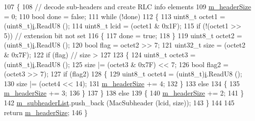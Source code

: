 \begin{DoxyCode}
107 \{
108         \textcolor{comment}{// decode sub-headers and create RLC info elements}
109         \hyperlink{classns3_1_1MmWaveMacPduHeader_ae473a43cc08ab2a1c7b9cb876c2642e8}{m\_headerSize} = 0;
110         \textcolor{keywordtype}{bool} done = \textcolor{keyword}{false};
111         \textcolor{keywordflow}{while} (!done)
112         \{
113                 uint8\_t octet1 = (uint8\_t)\hyperlink{bernuolliDistribution_8m_a6f6ccfcf58b31cb6412107d9d5281426}{i}.ReadU8 ();
114                 uint8\_t lcid = (octet1 & 0x1F);
115                 \textcolor{keywordflow}{if} (!(octet1 >> 5))  \textcolor{comment}{// extension bit not set}
116                 \{
117                         done = \textcolor{keyword}{true};
118                 \}
119                 uint8\_t octet2 = (uint8\_t)\hyperlink{bernuolliDistribution_8m_a6f6ccfcf58b31cb6412107d9d5281426}{i}.ReadU8 ();
120                 \textcolor{keywordtype}{bool} flag = octet2 >> 7;
121                 uint32\_t size = (octet2 & 0x7F);
122                 \textcolor{keywordflow}{if} (flag) \textcolor{comment}{// size > 127}
123                 \{
124                         uint8\_t octet3 = (uint8\_t)\hyperlink{bernuolliDistribution_8m_a6f6ccfcf58b31cb6412107d9d5281426}{i}.ReadU8 ();
125                         size |= (octet3 & 0x7F) << 7;
126                         \textcolor{keywordtype}{bool} flag2 = (octet3 >> 7);
127                         \textcolor{keywordflow}{if} (flag2)
128                         \{
129                                 uint8\_t octet4 = (uint8\_t)\hyperlink{bernuolliDistribution_8m_a6f6ccfcf58b31cb6412107d9d5281426}{i}.ReadU8 ();
130                                 size |= (octet4 << 14);
131                                 \hyperlink{classns3_1_1MmWaveMacPduHeader_ae473a43cc08ab2a1c7b9cb876c2642e8}{m\_headerSize} += 4;
132                         \}
133                         \textcolor{keywordflow}{else}
134                         \{
135                                 \hyperlink{classns3_1_1MmWaveMacPduHeader_ae473a43cc08ab2a1c7b9cb876c2642e8}{m\_headerSize} += 3;
136                         \}
137                 \}
138                 \textcolor{keywordflow}{else}
139                 \{
140                         \hyperlink{classns3_1_1MmWaveMacPduHeader_ae473a43cc08ab2a1c7b9cb876c2642e8}{m\_headerSize} += 2;
141                 \}
142                 \hyperlink{classns3_1_1MmWaveMacPduHeader_a7eee94275aa3be87d89481dc90c1787c}{m\_subheaderList}.push\_back (MacSubheader (lcid, size));
143         \}
144 
145         \textcolor{keywordflow}{return} \hyperlink{classns3_1_1MmWaveMacPduHeader_ae473a43cc08ab2a1c7b9cb876c2642e8}{m\_headerSize};
146 \}
\end{DoxyCode}


